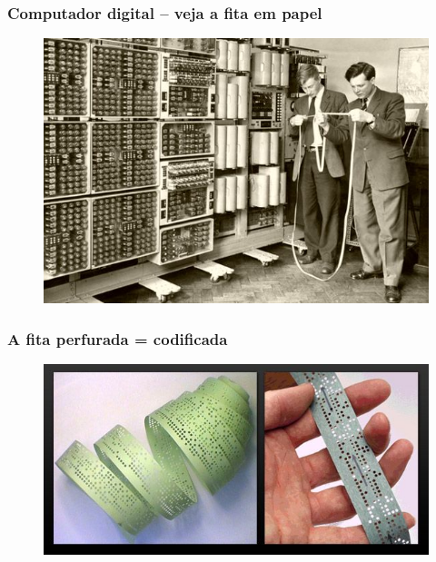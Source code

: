 \documentclass[10pt]{beamer}
\begin{document}
\begin{frame}[fragile]

\frametitle{Computador digital -- veja a fita em papel}

\begin{figure}[!ht]
\centering
\includegraphics[height =.65\textheight,width=.8\textwidth]
{figuras/computador_digital.jpg}
\end{figure}

\end{frame}






\begin{frame}[fragile]

\frametitle{A fita perfurada = codificada}

\begin{figure}[!ht]
\centering
\includegraphics[height =.65\textheight,width=.8\textwidth]
{figuras/fita_perfurada.jpg}
\end{figure}

\end{frame}
\end{document}

